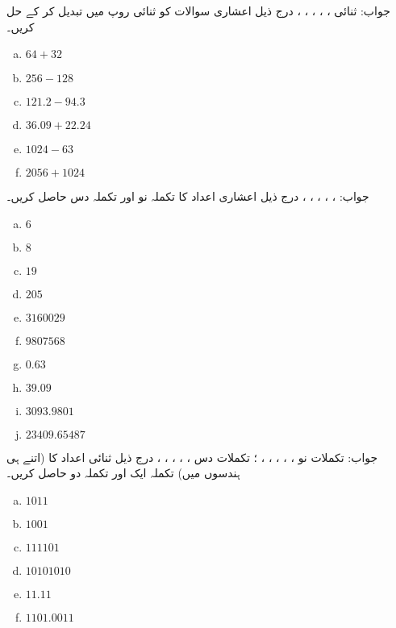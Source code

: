 جواب: ثنائی  ، ، ، ، ، 
درج ذیل اعشاری سوالات کو ثنائی روپ میں تبدیل کر کے حل کریں۔
\begin{multicols}{4}
\begin{enumerate}[a.]

\item  
 \(64+32\)  
\item  
 \(256-128\) 
\item  
 \(121.2-94.3\) 
\item  
 \(36.09+22.24\)  
\item  
 \(1024-63\) 
\item  
 \(2056+1024\)    
\end{enumerate}
\end{multicols}
جواب:  ، ، ، ، ، 
درج ذیل اعشاری اعداد کا تکملہ نو اور تکملہ دس حاصل کریں۔
\begin{multicols}{4}
\begin{enumerate}[a.]
\item  
 \(6\)  
\item   
 \(8\) 
\item  
 \(19\)  
\item   
 \(205\) 
\item  
 \(3160029\) 
\item   
 \(9807568\) 
\item  
 \(0.63\)  
\item   
 \(39.09\) 
\item  
 \(3093.9801\) 
\item   
 \(23409.65487\) 
\end{enumerate}
\end{multicols}
جواب:  تکملات نو  ، ، ، ، ، ؛ تکملات دس  ، ، ، ، ، 
درج ذیل ثنائی اعداد کا (اتنے  ہی ہندسوں میں)  تکملہ ایک اور تکملہ دو حاصل کریں۔
\begin{multicols}{4}
\begin{enumerate}[a.]

\item  
 \(1011\)  
\item   
 \(1001\) 
\item  
 \(111101\) 
\item   
 \(10101010\) 
\item  
 \(11.11\)  
\item   
 \(1101.0011\) 
\end{enumerate}
\end{multicols}
